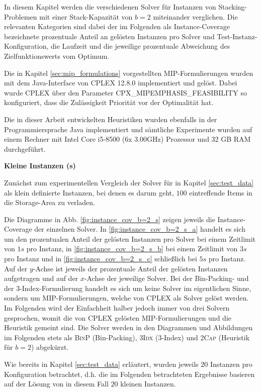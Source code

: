 In diesem Kapitel werden die verschiedenen Solver für Instanzen von Stacking-Problemen mit einer Stack-Kapazität von $b=2$ miteinander verglichen. Die relevanten Kategorien sind dabei der im Folgenden als Instance-Coverage bezeichnete prozentuale Anteil an gelösten Instanzen pro Solver und Test-Instanz-Konfiguration, die Laufzeit und die jeweilige prozentuale Abweichung des Zielfunktionswerts vom Optimum.

Die in Kapitel \ref{sec:mip_formulations} vorgestellten MIP-Formulierungen wurden mit dem Java-Interface von CPLEX 12.8.0 implementiert
und gelöst. Dabei wurde CPLEX über den Parameter \textsc{CPX\_MIPEMPHASIS\_FEASIBILITY} so konfiguriert, dass die Zulässigkeit
Priorität vor der Optimalität hat.\cite{IBM_DOC}

Die in dieser Arbeit entwickelten Heuristiken wurden ebenfalls in der Programmiersprache Java implementiert
und sämtliche Experimente wurden auf einem Rechner mit Intel Core i5-8500 (6x 3.00GHz) Prozessor und 32 GB RAM durchgeführt.

\pagebreak

\textbf{Kleine Instanzen (s)}

Zunächst zum experimentellen Vergleich der Solver für in Kapitel \ref{sec:test_data} als klein definierte Instanzen,
bei denen es darum geht, $100$ eintreffende Items in die Storage-Area zu verladen.

Die Diagramme in Abb. \ref{fig:instance_cov_b=2_s} zeigen jeweils die Instance-Coverage der einzelnen Solver.
In \ref{fig:instance_cov_b=2_s_a} handelt es sich um den prozentualen Anteil der gelösten Instanzen pro Solver bei einem Zeitlimit
von $1s$ pro Instanz, in \ref{fig:instance_cov_b=2_s_b} bei einem Zeitlimit von $3s$ pro Instanz und in \ref{fig:instance_cov_b=2_s_c}
schließlich bei $5s$ pro Instanz.\newline
Auf der $y$-Achse ist jeweils der prozentuale Anteil der gelösten Instanzen aufgetragen und auf der $x$-Achse der jeweilige Solver.
Bei der Bin-Packing- und der 3-Index-Formulierung handelt es sich um keine Solver im eigentlichen Sinne,
sondern um MIP-Formulierungen, welche von CPLEX als Solver gelöst werden.
Im Folgenden wird der Einfachheit halber jedoch immer von drei Solvern gesprochen, womit die von
CPLEX gelösten MIP-Formulierungen und die Heuristik gemeint sind.
Die Solver werden in den Diagrammen und Abbildungen im Folgenden stets als \textsc{BinP} (Bin-Packing),
\textsc{3Idx} (3-Index) und \textsc{2Cap} (Heuristik für $b = 2$) abgekürzt.

Wie bereits in Kapitel \ref{sec:test_data} erläutert, wurden jeweils $20$ Instanzen pro Konfiguration betrachtet,
d.h. die im Folgenden betrachteten Ergebnisse basieren auf der Lösung von in diesem Fall $20$ kleinen Instanzen.

